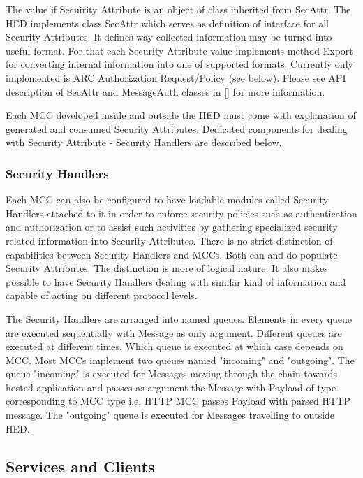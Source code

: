 \documentclass{book}
\begin{document}
The value if Secuirity Attribute is an object of class inherited from SecAttr. The HED implements class SecAttr which serves as definition of interface for all Security Attributes. It defines way collected information may be turned into useful format. For that each Security Attribute value implements method Export for converting internal information into one of supported formats. Currently only implemented is ARC Authorization Request/Policy (see below). Please see API description of SecAttr and MessageAuth classes in [] for more information.

Each MCC developed inside and outside the HED must come with explanation of generated and consumed Security Attributes. Dedicated components for dealing with Security Attribute - Security Handlers are described below.


\subsubsection{Security Handlers}

Each MCC can also be configured to have loadable modules called Security Handlers attached to it in order to enforce security policies such as authentication and authorization or to assist such activities by gathering specialized security related information into Security Attributes. There is no strict distinction of capabilities between Security Handlers and MCCs. Both can and do populate Security Attributes. The distinction is more of logical nature. It also makes possible to have Security Handlers dealing with similar kind of information and capable of acting on different protocol levels.

The Security Handlers are arranged into named queues. Elements in every queue are executed sequentially with Message as only argument. Different queues are executed at  different times. Which queue is executed at which case depends on MCC. Most MCCs implement two queues named "incoming" and "outgoing". The queue "incoming" is executed for Messages moving through the chain towards hosted application and passes as argument the Message with Payload of type corresponding to MCC type i.e. HTTP MCC passes Payload with parsed HTTP message. The "outgoing" queue is executed for Messages travelling to outside HED.


\subsection{Services and Clients}
\end{document}

